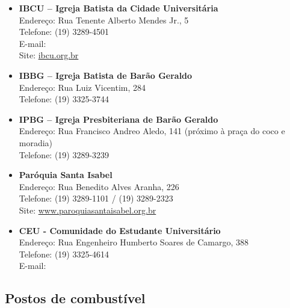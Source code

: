 \begin{itemize}
    \item   \textbf{IBCU -- Igreja Batista da Cidade Universitária}
        \\Endereço: Rua Tenente Alberto Mendes Jr., 5
        \\Telefone: (19) 3289-4501
        \\E-mail: 
        \\Site: \url{ibcu.org.br}

    \item   \textbf{IBBG -- Igreja Batista de Barão Geraldo}
        \\Endereço: Rua Luiz Vicentim, 284
        \\Telefone: (19) 3325-3744

    \item   \textbf{IPBG -- Igreja Presbiteriana de Barão Geraldo}
        \\Endereço: Rua Francisco Andreo Aledo, 141 (próximo à praça do coco e moradia)
        \\Telefone: (19) 3289-3239

    \item   \textbf{Paróquia Santa Isabel}
        \\Endereço: Rua Benedito Alves Aranha, 226
        \\Telefone: (19) 3289-1101 / (19) 3289-2323
        \\Site: \url{www.paroquiasantaisabel.org.br}

    \item   \textbf{CEU - Comunidade do Estudante Universitário}
        \\Endereço: Rua Engenheiro Humberto Soares de Camargo, 388
        \\Telefone: (19) 3325-4614
        \\E-mail: 
\end{itemize}

\subsection{Postos de combustível}

